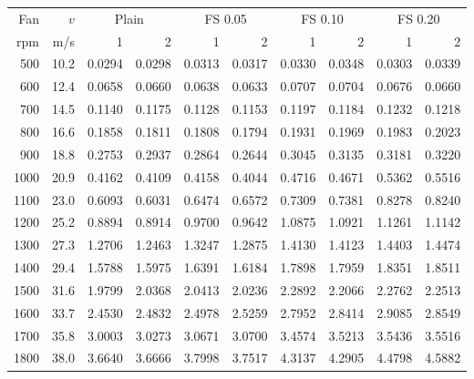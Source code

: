 \begin{tabular}{@{}rr rr rr rr rr@{}}
\toprule
Fan & $v$ & \multicolumn{2}{c}{Plain} & \multicolumn{2}{c}{FS 0.05} & \multicolumn{2}{c}{FS 0.10} & \multicolumn{2}{c}{FS 0.20} \\
\cmidrule(lr){3-4}\cmidrule(lr){5-6}\cmidrule(lr){7-8}\cmidrule(lr){9-10}
rpm & m/s & 1 & 2 & 1 & 2 & 1 & 2 & 1 & 2 \\
\midrule
500 & 10.2 & 0.0294 & 0.0298 & 0.0313 & 0.0317 & 0.0330 & 0.0348 & 0.0303 & 0.0339 \\
600 & 12.4 & 0.0658 & 0.0660 & 0.0638 & 0.0633 & 0.0707 & 0.0704 & 0.0676 & 0.0660 \\
700 & 14.5 & 0.1140 & 0.1175 & 0.1128 & 0.1153 & 0.1197 & 0.1184 & 0.1232 & 0.1218 \\
800 & 16.6 & 0.1858 & 0.1811 & 0.1808 & 0.1794 & 0.1931 & 0.1969 & 0.1983 & 0.2023 \\
900 & 18.8 & 0.2753 & 0.2937 & 0.2864 & 0.2644 & 0.3045 & 0.3135 & 0.3181 & 0.3220 \\
1000 & 20.9 & 0.4162 & 0.4109 & 0.4158 & 0.4044 & 0.4716 & 0.4671 & 0.5362 & 0.5516 \\
1100 & 23.0 & 0.6093 & 0.6031 & 0.6474 & 0.6572 & 0.7309 & 0.7381 & 0.8278 & 0.8240 \\
1200 & 25.2 & 0.8894 & 0.8914 & 0.9700 & 0.9642 & 1.0875 & 1.0921 & 1.1261 & 1.1142 \\
1300 & 27.3 & 1.2706 & 1.2463 & 1.3247 & 1.2875 & 1.4130 & 1.4123 & 1.4403 & 1.4474 \\
1400 & 29.4 & 1.5788 & 1.5975 & 1.6391 & 1.6184 & 1.7898 & 1.7959 & 1.8351 & 1.8511 \\
1500 & 31.6 & 1.9799 & 2.0368 & 2.0413 & 2.0236 & 2.2892 & 2.2066 & 2.2762 & 2.2513 \\
1600 & 33.7 & 2.4530 & 2.4832 & 2.4978 & 2.5259 & 2.7952 & 2.8414 & 2.9085 & 2.8549 \\
1700 & 35.8 & 3.0003 & 3.0273 & 3.0671 & 3.0700 & 3.4574 & 3.5213 & 3.5436 & 3.5516 \\
1800 & 38.0 & 3.6640 & 3.6666 & 3.7998 & 3.7517 & 4.3137 & 4.2905 & 4.4798 & 4.5882 \\
\bottomrule
\end{tabular}

